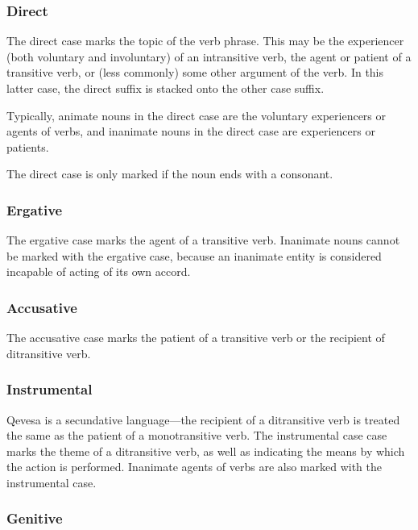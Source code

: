 \documentclass[grammar]{subfiles}
\begin{document}
\subsubsection{Direct}
\label{sssec:ns_direct_case}

The direct case marks the topic of the verb phrase.  This may be the
experiencer (both voluntary and involuntary) of an intransitive verb, the agent
or patient of a transitive verb, or (less commonly) some other argument of the
verb.  In this latter case, the direct suffix is stacked onto the other case
suffix. 

Typically, animate nouns in the direct case are the voluntary experiencers or
agents of verbs, and inanimate nouns in the direct case are experiencers or
patients. 

The direct case is only marked if the noun ends with a consonant. 


\subsubsection{Ergative}
\label{sssec:ns_ergative_case}

The ergative case marks the agent of a transitive verb.  Inanimate nouns cannot
be marked with the ergative case, because an inanimate entity is considered
incapable of acting of its own accord. 


\subsubsection{Accusative}
\label{sssec:ns_accusative_case}

The accusative case marks the patient of a transitive verb or the recipient of
ditransitive verb.


\subsubsection{Instrumental}
\label{sssec:ns_instrumental_case}

Qevesa is a secundative language—the recipient of a ditransitive verb
is treated the same as the patient of a monotransitive verb. The instrumental
case case marks the theme of a ditransitive verb, as well as indicating the
means by which the action is performed.  Inanimate agents of verbs are also
marked with the instrumental case.  

\Tbw


\subsubsection{Genitive}
\label{sssec:ns_genitive_case}
\end{document}
